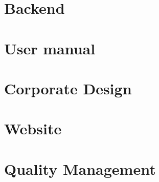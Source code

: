 \section{Backend}














\section{User manual}
\def\kapitelautor{Julian Lorenz}


\section{Corporate Design}
\def\kapitelautor{Julian Lorenz}

\section{Website}
\def\kapitelautor{Julian Lorenz}


\section{Quality Management}
\def\kapitelautor{Julian Lorenz}

